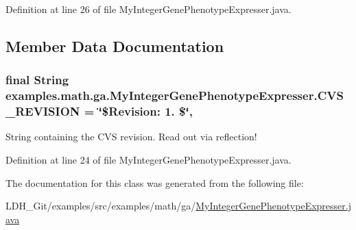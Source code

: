 Definition at line 26 of file My\-Integer\-Gene\-Phenotype\-Expresser.\-java.



\subsection{Member Data Documentation}
\hypertarget{classexamples_1_1math_1_1ga_1_1_my_integer_gene_phenotype_expresser_ad51de0e58ef131c9db62d8ade1e2dd5a}{
\subsubsection[{C\-V\-S\-\_\-\-R\-E\-V\-I\-S\-I\-O\-N}]{\setlength{\rightskip}{0pt plus 5cm}final String examples.\-math.\-ga.\-My\-Integer\-Gene\-Phenotype\-Expresser.\-C\-V\-S\-\_\-\-R\-E\-V\-I\-S\-I\-O\-N = \char`\"{}\$Revision\-: 1. \$\char`\"{}\hspace{0.3cm}{\ttfamily [static]}, {\ttfamily [private]}}}\label{classexamples_1_1math_1_1ga_1_1_my_integer_gene_phenotype_expresser_ad51de0e58ef131c9db62d8ade1e2dd5a}
String containing the C\-V\-S revision. Read out via reflection! 

Definition at line 24 of file My\-Integer\-Gene\-Phenotype\-Expresser.\-java.



The documentation for this class was generated from the following file\-:\begin{DoxyCompactItemize}
\item 
L\-D\-H\-\_\-\-Git/examples/src/examples/math/ga/\hyperlink{_my_integer_gene_phenotype_expresser_8java}{My\-Integer\-Gene\-Phenotype\-Expresser.\-java}\end{DoxyCompactItemize}
